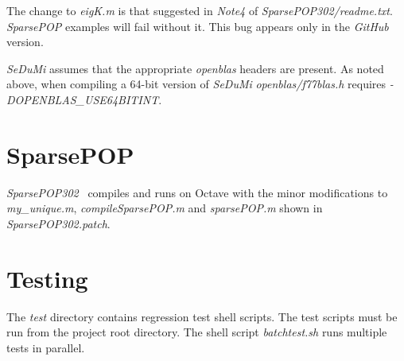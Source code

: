 \documentclass[a4paper,twoside,10pt,english]{report}
\begin{document}
The change to \emph{eigK.m} is that suggested in \emph{Note4} of 
\emph{SparsePOP302/readme.txt}. \emph{SparsePOP} examples will fail without it.
This bug appears only in the \emph{GitHub} version.

\emph{SeDuMi} assumes that the appropriate \emph{openblas} headers are
present. As noted above, when compiling a 64-bit version of \emph{SeDuMi}
\emph{openblas/f77blas.h} requires \emph{-DOPENBLAS\_USE64BITINT}. 

\section*{SparsePOP}
\emph{SparsePOP302}~\cite{SparsePOP} compiles and runs on Octave with the
minor modifications to \emph{my\_unique.m}, \emph{compileSparsePOP.m} and
\emph{sparsePOP.m} shown in \emph{SparsePOP302.patch}.

\section*{Testing}
The \emph{test} directory contains regression test shell
scripts. The test scripts must be run from the project root directory. The
shell script \emph{batchtest.sh} runs multiple tests in parallel.

\end{document}
